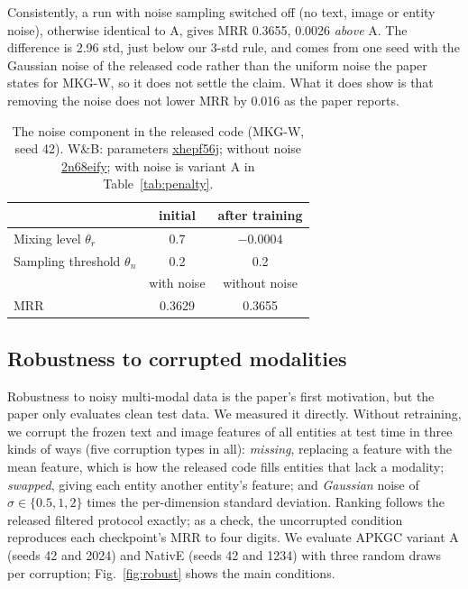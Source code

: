 \documentclass[conference,a4paper]{IEEEtran}
\newcommand{\wb}[2]{\href{https://wandb.ai/nhantrnh-graphml/#1}{{\normalfont\ttfamily #2}}}
\begin{document}
Consistently, a run with noise sampling switched off (no text, image or entity noise), otherwise
identical to A, gives MRR 0.3655, 0.0026 \emph{above} A. The difference is 2.96 std, just
below our 3-std rule, and comes from one seed with the Gaussian noise of the released code
rather than the uniform noise the paper states for MKG-W, so it does not settle the claim.
What it does show is that removing the noise does not lower MRR by 0.016 as the paper
reports.

\begin{table}[!t]
\centering
\caption{The noise component in the released code (MKG-W, seed 42). W\&B: parameters \wb{apkgc-repro/runs/xhepf56j}{xhepf56j}; without noise \wb{apkgc-repro/runs/2n68eify}{2n68eify}; with noise is variant A in Table~\ref{tab:penalty}.}
\label{tab:noise}
\small
\setlength{\tabcolsep}{4pt}
\begin{tabular}{lcc}
\toprule
 & initial & after training\\
\midrule
Mixing level $\theta_r$ & 0.7 & $-0.0004$\\
Sampling threshold $\theta_n$ & 0.2 & 0.2\\
\midrule
 & with noise & without noise\\
\midrule
MRR & 0.3629 & 0.3655\\
\bottomrule
\end{tabular}
\end{table}

\subsection{Robustness to corrupted modalities}
\label{sec:c4}
Robustness to noisy multi-modal data is the paper's first motivation, but the paper only
evaluates clean test data. We measured it directly. Without retraining, we corrupt the
frozen text and image features of all entities at test time in three kinds of ways (five
corruption types in all):
\emph{missing}, replacing a feature with the mean feature, which is how the released code
fills entities that lack a modality; \emph{swapped}, giving each entity another entity's
feature; and \emph{Gaussian} noise of $\sigma\in\{0.5,1,2\}$ times the per-dimension
standard deviation. Ranking follows the released filtered protocol exactly; as a check,
the uncorrupted condition reproduces each checkpoint's MRR to four digits. We evaluate
APKGC variant A (seeds 42 and 2024) and NativE (seeds 42 and 1234) with three random draws
per corruption; Fig.~\ref{fig:robust} shows the main conditions.
\end{document}
